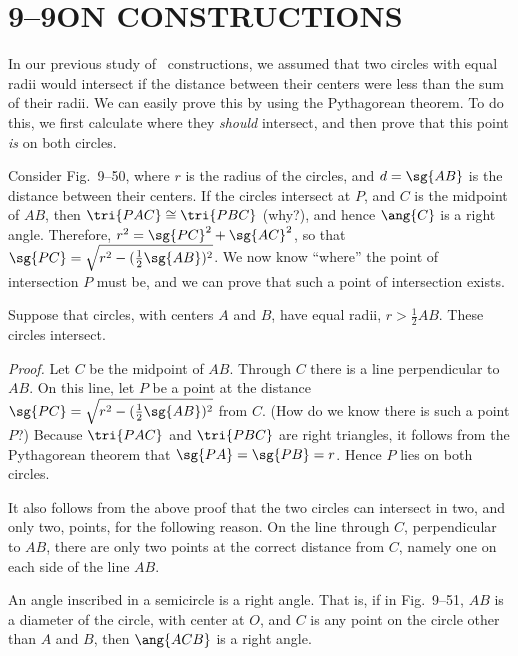 \documentclass[11pt]{book}
\theoremstyle{bkplain}
\theoremstyle{XIplainnote}
\theoremstyle{bkplain}
\theoremstyle{bkplain}
\begin{document}
\section*{9--9\quad ON CONSTRUCTIONS}

In our previous study of \RC\ constructions, we assumed that two circles with
equal radii would intersect if the distance between their centers were less than
the sum of their radii. We can easily prove this by using the Pythagorean
theorem. To do this, we first calculate where they \emph{should} intersect, and
then prove that this point \emph{is} on both circles.

\FIGIXFIFTYFIFTYONE

Consider Fig.~9--50, where $r$ is the radius of the circles, and $d = \sg{AB}$ is
the distance between their centers. If the circles intersect at $P$, and $C$ is
the midpoint of $AB$, then
$\tri{PAC} \cong \tri{PBC}$ (why?), and hence $\ang{C}$ is a right angle.
Therefore, $r^2 = \sg{PC}^2 + \sg{AC}^2$, so that
$\sg{PC} = \sqrt{r^2 - (\frac{1}{2}\sg{AB})^2}$. We now know ``where'' the point
of intersection $P$ must be, and we can prove that such a point of intersection
exists.

\begin{theorem}
Suppose that circles, with centers $A$ and $B$, have equal radii,
$r > \frac{1}{2}AB$. These circles intersect.
\end{theorem}

\noindent\emph{Proof.} Let $C$ be the midpoint of $AB$. Through $C$ there is a
line perpendicular to $AB$. On this line, let $P$ be a point at the distance
$\sg{PC} = \sqrt{r^2 - (\frac{1}{2}\sg{AB})^2}$ from $C$. (How do we know there
is such a point $P$?) Because $\tri{PAC}$ and $\tri{PBC}$ are right triangles, it
follows from the Pythagorean theorem that $\sg{PA} = \sg{PB} = r$. Hence $P$ lies
on both circles.

\begin{remark}
It also follows from the above proof that the two circles can intersect in two,
and only two, points, for the following reason. On the line through $C$,
perpendicular to $AB$, there are only two points at the correct distance from
$C$, namely one on each side of the line $AB$.
\end{remark}

\begin{theorem}
An angle inscribed in a semicircle is a right angle. That is, if in Fig.~9--51,
$AB$ is a diameter of the circle, with center at $O$, and $C$ is any point on the
circle other than $A$ and $B$, then $\ang{ACB}$ is a right angle.
\end{theorem}
\end{document}
